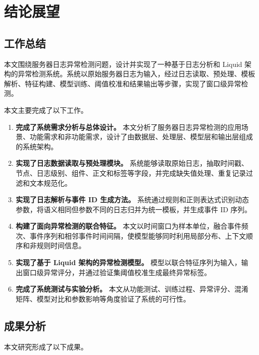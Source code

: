 \chapter{结论展望}

\section{工作总结}

本文围绕服务器日志异常检测问题，设计并实现了一种基于日志分析和 Liquid 架构的异常检测系统。系统以原始服务器日志为输入，经过日志读取、预处理、模板解析、特征构建、模型训练、阈值校准和结果输出等步骤，实现了窗口级异常检测。

本文主要完成了以下工作。

\begin{enumerate}
    \item \textbf{完成了系统需求分析与总体设计。} 本文分析了服务器日志异常检测的应用场景、功能需求和非功能需求，设计了由数据层、处理层、模型层和输出层组成的系统架构。
    
    \item \textbf{实现了日志数据读取与预处理模块。} 系统能够读取原始日志，抽取时间戳、节点、日志级别、组件、正文和标签等字段，并完成缺失值处理、重复记录过滤和文本规范化。
    
    \item \textbf{实现了日志解析与事件 ID 生成方法。} 系统通过规则和正则表达式识别动态参数，将语义相同但参数不同的日志归并为统一模板，并生成事件 ID 序列。
    
    \item \textbf{构建了面向异常检测的联合特征。} 本文以时间窗口为样本单位，融合事件频次、事件序列和相邻事件时间间隔，使模型能够同时利用局部分布、上下文顺序和非规则时间信息。
    
    \item \textbf{实现了基于 Liquid 架构的异常检测模型。} 模型以联合特征序列为输入，输出窗口级异常评分，并通过验证集阈值校准生成最终异常标签。
    
    \item \textbf{完成了系统测试与实验分析。} 本文从功能测试、训练过程、异常评分、混淆矩阵、模型对比和参数影响等角度验证了系统的可行性。
\end{enumerate}

\section{成果分析}

本文研究形成了以下成果。

